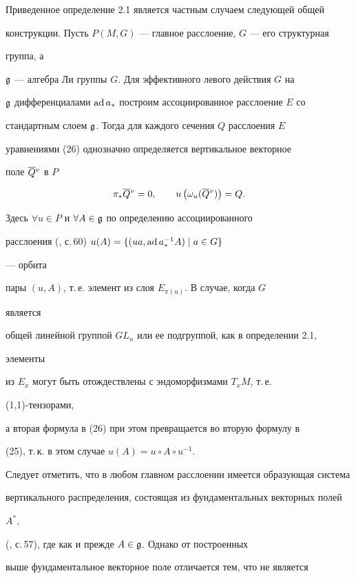 Приведенное определение 2.1 является частным случаем следующей общей


конструкции. Пусть $P(M,G)$ --- главное расслоение, $G$ --- его структурная


группа, а


$\frak g$ --- алгебра Ли группы $G$. Для эффективного левого действия $G$ на


$\frak g$ дифференциалами $\operatorname{ad} a_*$ построим ассоциированное расслоение $E$ со


стандартным слоем $\frak g$. Тогда для каждого сечения $Q$ расслоения $E$


уравнениями (26) однозначно определяется вертикальное векторное


поле $\overline {Q}{}^v$ в $P$


\begin{equation}


\pi _*\olv Q=0,\qquad u\left( \omega _u(\olv Q)\right) =Q.


\end{equation}


Здесь $\forall u\in P$ и $\forall A\in \frak g$ по определению ассоциированного


расслоения (\cite{Kob1}, с.\,60) $u(A)=\{ (ua,\operatorname{ad} a^{-1}_*A)\mid a\in G\} $


--- орбита


пары $(u,A)$, т.\,е. элемент из слоя $E_{\pi (u)}$. В случае, когда $G$


является


общей линейной группой $GL_n$ или ее подгруппой, как в определении 2.1,


элементы


из $E_x$ могут быть отождествлены с эндоморфизмами $T_xM$, т.\,е.


(1,1)-тензорами,


а вторая формула в (26) при этом превращается во вторую формулу в


(25), т.\,к. в этом случае $u(A)=u\circ A\circ u^{-1}$.





Следует отметить, что в любом главном расслоении имеется образующая система


вертикального распределения, состоящая из фундаментальных векторных полей


$A^*$,


(\cite{Kob1}, с.\,57), где как и прежде $A\in \frak g$. Однако от построенных


выше фундаментальное векторное поле отличается тем, что не является


